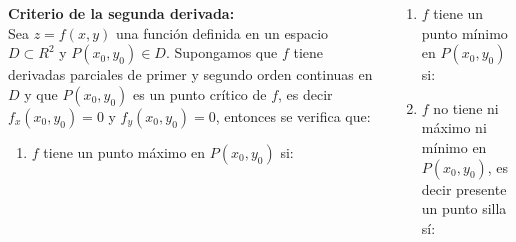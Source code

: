 \begin{columns}
            \begin{column}{0.47\textwidth}
                \justify
                \textbf{Criterio de la segunda derivada:}  
                \\Sea $z=f(x,y)$ una función definida en un espacio $D \subset R^{2}$ y $P(x_{0},y_{0}) \in D$. Supongamos que $f$ tiene derivadas parciales de primer y segundo orden continuas en $D$ y que $P(x_{0},y_{0})$ es un punto crítico de $f$, es decir $f_{x}(x_{0},y_{0})=0$ y $f_{y}(x_{0},y_{0})=0$, entonces se verifica que:
                \begin{enumerate}
                    \item $f$ tiene un punto máximo en $P(x_{0},y_{0})$ si:
                    \\
                    \setcounter{nameOfYourChoice}{\value{enumi}}
                \end{enumerate}
            \end{column}
            \begin{column}{0.47\textwidth}
                \begin{enumerate}
                    \setlength\itemsep{1em}
                    
                    \setcounter{enumi}{\value{nameOfYourChoice}}
                    \item $f$ tiene un punto mínimo en $P(x_{0},y_{0})$ si:
                    \\
                    
                    \item $f$ no tiene ni máximo ni mínimo en $P(x_{0},y_{0})$, es decir presente un punto silla sí:
                    \\
                    

\end{enumerate}
\end{column}
\end{columns}
